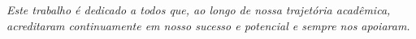 \begin{dedicatoria}
   \vspace*{\fill}
   \centering
   \noindent

   \textit{
    Este trabalho é dedicado a todos que, ao longo de nossa trajetória acadêmica, 
    acreditaram continuamente em nosso sucesso e potencial e sempre nos apoiaram.} \vspace*{\fill}
\end{dedicatoria}
